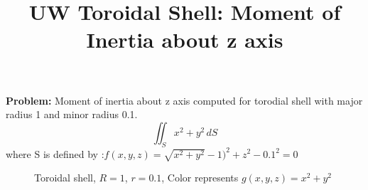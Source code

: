 \documentclass[9pt,twocolumn,twoside,notitlepage]{article}
\title{UW Toroidal Shell: Moment of Inertia about z axis}
\date{}
\begin{document}
 \twocolumn[
   \begin{@twocolumnfalse}
     \maketitle
   \end{@twocolumnfalse}
   ]


 \textbf{Problem: }
 Moment of inertia about z axis computed for torodial shell with major radius 1 and minor radius 0.1.
 $$\iint_S  x^2 + y^2 \,dS$$
 where S is defined by :\newline $f(x,y,z)=\sqrt{x^2+y^2}-1)^2+z^2 - 0.1^2=0$
  \begin{figure}[htbp]
  \centering
  \caption{Toroidal shell, $R= 1$, $r=0.1$, Color represents $g(x,y,z)=x^2+y^2$}
  \end{figure}
\end{document}
